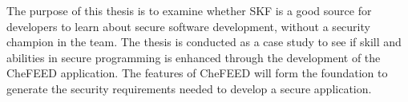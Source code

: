 The purpose of this thesis is to examine whether SKF is a good source for developers to learn about secure software development, without a security champion in the team. The thesis is conducted as a case study to see if skill and abilities in secure programming is enhanced through the development of the CheFEED application. The features of CheFEED will form the foundation to generate the security requirements needed to develop a secure application.

